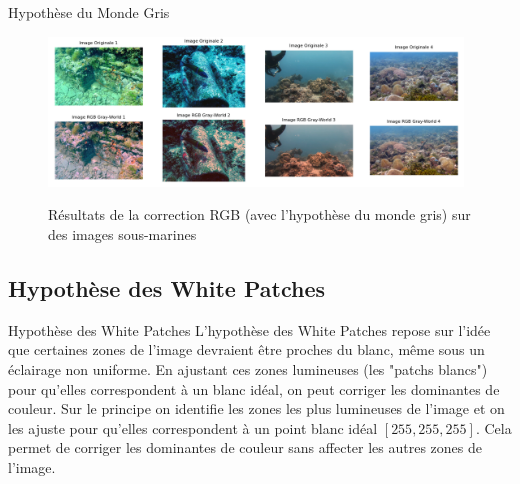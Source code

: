 \documentclass[8pt,a4paper]{beamer}
\numberwithin{figure}{section}
\begin{document}
\begin{frame}{Hypothèse du Monde Gris}
\begin{center}
\begin{figure}[h!]
\includegraphics[width=11cm]{image004.png}
\label{figure2.1}
\caption{Résultats de la correction RGB (avec l'hypothèse du monde gris) sur des images sous-marines}
\end{figure} 
\end{center}
\end{frame}


\subsection{Hypothèse des White Patches}
\begin{frame}{Hypothèse des White Patches}
L’hypothèse des White Patches repose sur l’idée que certaines zones de l’image devraient être proches du blanc, même sous un éclairage non uniforme. En ajustant ces zones lumineuses (les "patchs blancs") pour qu'elles correspondent à un blanc idéal, on peut corriger les dominantes de couleur. Sur le principe on identifie les zones les plus lumineuses de l’image et on les ajuste pour qu’elles correspondent à un point blanc idéal \([255, 255, 255]\). Cela permet de corriger les dominantes de couleur sans affecter les autres zones de l’image.
\end{frame}
\end{document}
